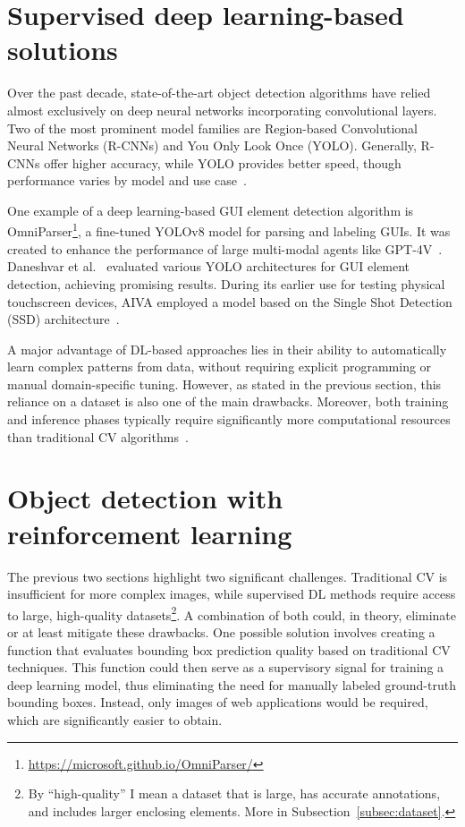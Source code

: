 \documentclass[
  digital,     %
  oneside,     %
  nosansbold,  %
  nocolorbold, %
  lof,         %
  lot,         %
]{fithesis4}
\begin{document}
\section{Supervised deep learning-based solutions}
Over the past decade, state-of-the-art object detection algorithms have relied almost exclusively on deep neural networks incorporating convolutional layers. Two of the most prominent model families are Region-based Convolutional Neural Networks (R-CNNs) and You Only Look Once (YOLO). Generally, R-CNNs offer higher accuracy, while YOLO provides better speed, though performance varies by model and use case~\cite{ObjectDetectionHistorySurvey}.

One example of a deep learning-based GUI element detection algorithm is OmniParser\footnote{\url{https://microsoft.github.io/OmniParser/}}, a fine-tuned YOLOv8 model for parsing and labeling GUIs. It was created to enhance the performance of large multi-modal agents like GPT-4V~\cite{OmniParser}. Daneshvar et al.~\cite{GUI_YOLO_comparison} evaluated various YOLO architectures for GUI element detection, achieving promising results. During its earlier use for testing physical touchscreen devices, AIVA employed a model based on the Single Shot Detection (SSD) architecture~\cite{Horak2020thesis}.

A major advantage of DL-based approaches lies in their ability to automatically learn complex patterns from data, without requiring explicit programming or manual domain-specific tuning. However, as stated in the previous section, this reliance on a dataset is also one of the main drawbacks. Moreover, both training and inference phases typically require significantly more computational resources than traditional CV algorithms~\cite{DLvsTCV}.

\section{Object detection with reinforcement learning}

The previous two sections highlight two significant challenges. Traditional CV is insufficient for more complex images, while supervised DL methods require access to large, high-quality datasets\footnote{By \enquote{high-quality} I mean a dataset that is large, has accurate annotations, and includes larger enclosing elements. More in Subsection~\ref{subsec:dataset}.}. A combination of both could, in theory, eliminate or at least mitigate these drawbacks. One possible solution involves creating a function that evaluates bounding box prediction quality based on traditional CV techniques. This function could then serve as a supervisory signal for training a deep learning model, thus eliminating the need for manually labeled ground-truth bounding boxes. Instead, only images of web applications would be required, which are significantly easier to obtain.
\end{document}

